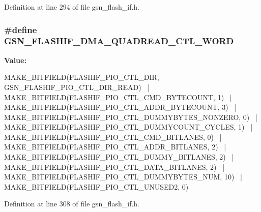 Definition at line 294 of file gsn\_\-flash\_\-if.h.

\hypertarget{a00501_ae7913b164750c89b5861527237f86968}{
\subsubsection[{GSN\_\-FLASHIF\_\-DMA\_\-QUADREAD\_\-CTL\_\-WORD}]{\setlength{\rightskip}{0pt plus 5cm}\#define GSN\_\-FLASHIF\_\-DMA\_\-QUADREAD\_\-CTL\_\-WORD}}
\label{a00501_ae7913b164750c89b5861527237f86968}
{\bfseries Value:}
\begin{DoxyCode}
MAKE_BITFIELD(FLASHIF_PIO_CTL_DIR, GSN_FLASHIF_PIO_CTL_DIR_READ) \
        | MAKE_BITFIELD(FLASHIF_PIO_CTL_CMD_BYTECOUNT, 1) \
        | MAKE_BITFIELD(FLASHIF_PIO_CTL_ADDR_BYTECOUNT, 3) \
        | MAKE_BITFIELD(FLASHIF_PIO_CTL_DUMMYBYTES_NONZERO, 0) \
        | MAKE_BITFIELD(FLASHIF_PIO_CTL_DUMMYCOUNT_CYCLES, 1) \
        | MAKE_BITFIELD(FLASHIF_PIO_CTL_CMD_BITLANES, 0) \
        | MAKE_BITFIELD(FLASHIF_PIO_CTL_ADDR_BITLANES, 2) \
        | MAKE_BITFIELD(FLASHIF_PIO_CTL_DUMMY_BITLANES, 2) \
        | MAKE_BITFIELD(FLASHIF_PIO_CTL_DATA_BITLANES, 2) \
        | MAKE_BITFIELD(FLASHIF_PIO_CTL_DUMMYBYTES_NUM, 10) \
        | MAKE_BITFIELD(FLASHIF_PIO_CTL_UNUSED2, 0)
\end{DoxyCode}


Definition at line 308 of file gsn\_\-flash\_\-if.h.

